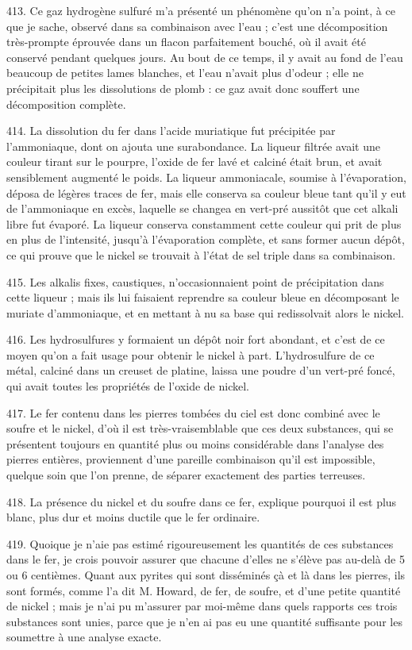 \documentclass[a4paper, 11pt, oneside, polutonikogreek, french]{article}
\begin{document}
413. Ce gaz hydrogène sulfuré m'a présenté un phénomène qu'on n'a point, à ce que je sache, observé dans sa combinaison avec l'eau ; c'est une décomposition très-prompte éprouvée dans un flacon parfaitement bouché, où il avait été conservé pendant quelques jours. Au bout de ce temps, il y avait au fond de l'eau beaucoup de petites lames blanches, et l'eau n'avait plus d'odeur ; elle ne précipitait plus les dissolutions de plomb : ce gaz avait donc souffert une décomposition complète.

414. La dissolution du fer dans l'acide muriatique fut précipitée par l'ammoniaque, dont on ajouta une surabondance. La liqueur filtrée avait une couleur tirant sur le pourpre, l'oxide de fer lavé et calciné était brun, et avait sensiblement augmenté le poids. La liqueur ammoniacale, soumise à l'évaporation, déposa de légères traces de fer, mais elle conserva sa couleur bleue tant qu'il y eut de l'ammoniaque en excès, laquelle se changea en vert-pré aussitôt que cet alkali libre fut évaporé. La liqueur conserva constamment cette couleur qui prit de plus en plus de l'intensité, jusqu'à l'évaporation complète, et sans former aucun dépôt, ce qui prouve que le nickel se trouvait à l'état de sel triple dans sa combinaison.

415. Les alkalis fixes, caustiques, n'occasionnaient point de précipitation dans cette liqueur ; mais ils lui faisaient reprendre sa couleur bleue en décomposant le muriate d'ammoniaque, et en mettant à nu sa base qui redissolvait alors le nickel.

416. Les hydrosulfures y formaient un dépôt noir fort abondant, et c'est de ce moyen qu'on a fait usage pour obtenir le nickel à part. L'hydrosulfure de ce métal, calciné dans un creuset de platine, laissa une poudre d'un vert-pré foncé, qui avait toutes les propriétés de l'oxide de nickel.

417. Le fer contenu dans les pierres tombées du ciel est donc combiné avec le soufre et le nickel, d'où il est très-vraisemblable que ces deux substances, qui se présentent toujours en quantité plus ou moins considérable dans l'analyse des pierres entières, proviennent d'une pareille combinaison qu'il est impossible, quelque soin que l'on prenne, de séparer exactement des parties terreuses.

418. La présence du nickel et du soufre dans ce fer, explique pourquoi il est plus blanc, plus dur et moins ductile que le fer ordinaire.

419. Quoique je n'aie pas estimé rigoureusement les quantités de ces substances dans le fer, je crois pouvoir assurer que chacune d'elles ne s'élève pas au-delà de 5 ou 6 centièmes. Quant aux pyrites qui sont disséminés çà et là dans les pierres, ils sont formés, comme l'a dit M. Howard, de fer, de soufre, et d'une petite quantité de nickel ; mais je n'ai pu m'assurer par moi-même dans quels rapports ces trois substances sont unies, parce que je n'en ai pas eu une quantité suffisante pour les soumettre à une analyse exacte.
\end{document}
